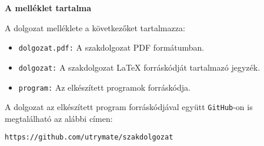 \pagestyle{empty}

\noindent \textbf{\Large A melléklet tartalma}

\vskip 1cm

\noindent A dolgozat melléklete a következőket tartalmazza:
\begin{itemize}
\item \texttt{dolgozat.pdf:} A szakdolgozat PDF formátumban.
\item \texttt{dolgozat:} A szakdolgozat \LaTeX{} forráskódját tartalmazó jegyzék.
\item \texttt{program:} Az elkészített programok forráskódja.
\end{itemize}
A dolgozat az elkészített program forráskódjával együtt \texttt{GitHub}-on is megtalálható az alábbi címen:

\vskip 0.5cm

\texttt{https://github.com/utrymate/szakdolgozat}